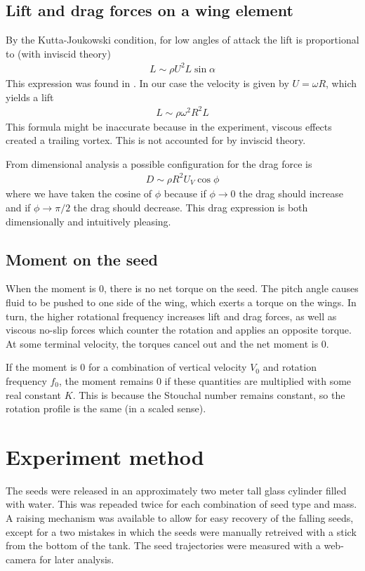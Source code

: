 \documentclass[aps,reprint]{revtex4-1}
\begin{document}
\subsection{Lift and drag forces on a wing element}
By the Kutta-Joukowski condition, for low angles of attack the lift is
proportional to (with inviscid theory)
\begin{align*}
    L \sim \rho U^2 L \sin{\alpha}
\end{align*}
This expression was found in \cite{acheson}.
In our case the velocity is given by $U = \omega R$, which yields a lift
\begin{align}
  L \sim \rho \omega^2 R^2 L
\end{align}
This formula might be inaccurate because in the experiment, viscous effects
created a trailing vortex. This is not accounted for by inviscid theory.

From dimensional analysis a possible configuration for the drag force is
\begin{align}
  D \sim \rho R^2 U_V \cos{\phi}
\end{align}
where we have taken the cosine of $\phi$ because if $\phi \rightarrow 0$ the
drag should increase and if $\phi \rightarrow \pi/2$ the drag should decrease.
This drag expression is both dimensionally and intuitively pleasing.
\subsection{Moment on the seed}
When the moment is 0, there is no net torque on the seed. The pitch angle causes
fluid to be pushed to one side of the wing, which exerts a torque on the wings.
In turn, the higher rotational frequency increases lift and drag forces, as well
as viscous no-slip forces which counter the rotation and applies an opposite
torque. At some terminal velocity, the torques cancel out and the net moment is
0.

If the moment is 0 for a combination of vertical velocity $V_0$ and rotation
frequency $f_0$, the moment remains 0 if these quantities are multiplied with
some real constant $K$. This is because the Stouchal number remains constant,
so the rotation profile is the same (in a scaled sense).
\section{Experiment method}
The seeds were released in an approximately two meter tall glass cylinder filled
with water. This was repeaded twice for each combination of seed type and mass.
A raising mechanism was available to allow for easy recovery of the falling
seeds, except for a two mistakes in which the seeds were manually retreived with
a stick from the bottom of the tank. The seed trajectories were measured with
a web-camera for later analysis.
\end{document}
